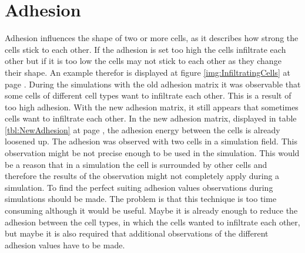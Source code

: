 \section{Adhesion}
Adhesion influences the shape of two or more cells, as it describes how strong the cells stick to each other. If the adhesion is set too high the cells infiltrate each other but if it is too low the cells may not stick to each other as they change their shape. An example therefor is displayed at figure \ref{img:InfiltratingCells} at page \pageref{img:InfiltratingCells}. During the simulations with the old adhesion matrix it was observable that some cells of different cell types want to infiltrate each other. This is a result of too high adhesion. With the new adhesion matrix, it still appears that sometimes cells want to infiltrate each other. In the new adhesion matrix, displayed in table \ref{tbl:NewAdhesion} at page \pageref{tbl:NewAdhesion}, the adhesion energy between the cells is already loosened up. The adhesion was observed with two cells in a simulation field. This observation might be not precise enough to be used in the simulation. This would be a reason that in a simulation the cell is surrounded by other cells and therefore the results of the observation might not completely apply during a simulation. To find the perfect suiting adhesion values observations during simulations should be made. The problem is that this technique is too time consuming although it would be useful. Maybe it is already enough to reduce the adhesion between the cell types, in which the cells wanted to infiltrate each other, but maybe it is also required that additional observations of the different adhesion values have to be made.

